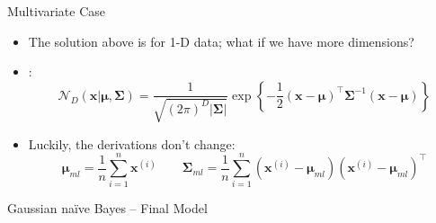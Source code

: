 \begin{frame}{Multivariate Case}{}\important
	\begin{itemize}
		\item The solution above is for 1-D data; what if we have more dimensions?
		\item {}:
		\begin{equation}
			\mathcal{N}_D(\bm{x} \vert \bm{\mu}, \bm{\Sigma})
				= \frac{1}{\sqrt{(2 \pi)^D \vert \bm{\Sigma} \vert}}
					\exp\left\{ -\frac{1}{2} (\bm{x} - \bm{\mu})^{\intercal} \bm{\Sigma}^{-1} (\bm{x} - \bm{\mu}) \right\}
		\end{equation}
		\item Luckily, the derivations don't change:
		\begin{equation}
			\bm{\mu}_{ml} = \frac{1}{n} \sum_{i=1}^n \bm{x}^{(i)}
			\qquad
			\bm{\Sigma}_{ml} = \frac{1}{n} \sum_{i=1}^n (\bm{x}^{(i)} - \bm{\mu}_{ml}) (\bm{x}^{(i)} - \bm{\mu}_{ml})^{\intercal}
		\end{equation}
	\end{itemize}
\end{frame}


\begin{frame}{Gaussian na\"{i}ve Bayes -- Final Model}{}
\end{frame}


